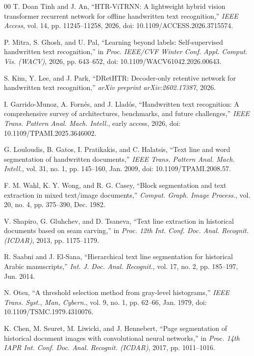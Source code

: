 \documentclass{IEEEtran}
\begin{document}
\begin{thebibliography}{00}
 T. Doan Tinh and J. An, ``HTR-ViTRNN: A lightweight hybrid vision transformer recurrent network for offline handwritten text recognition,'' \emph{IEEE Access}, vol. 14, pp. 11245--11258, 2026, doi: 10.1109/ACCESS.2026.3715574.

 P. Mitra, S. Ghosh, and U. Pal, ``Learning beyond labels: Self-supervised handwritten text recognition,'' in \emph{Proc. IEEE/CVF Winter Conf. Appl. Comput. Vis. (WACV)}, 2026, pp. 643--652, doi: 10.1109/WACV61042.2026.00643.

 S. Kim, Y. Lee, and J. Park, ``DRetHTR: Decoder-only retentive network for handwritten text recognition,'' \emph{arXiv preprint arXiv:2602.17387}, 2026.

 I. Garrido-Munoz, A. Forn{\'e}s, and J. Llad{\'o}s, ``Handwritten text recognition: A comprehensive survey of architectures, benchmarks, and future challenges,'' \emph{IEEE Trans. Pattern Anal. Mach. Intell.}, early access, 2026, doi: 10.1109/TPAMI.2025.3646002.

 G. Louloudis, B. Gatos, I. Pratikakis, and C. Halatsis, ``Text line and word segmentation of handwritten documents,'' \emph{IEEE Trans. Pattern Anal. Mach. Intell.}, vol. 31, no. 1, pp. 145--160, Jan. 2009, doi: 10.1109/TPAMI.2008.57.

 F. M. Wahl, K. Y. Wong, and R. G. Casey, ``Block segmentation and text extraction in mixed text/image documents,'' \emph{Comput. Graph. Image Process.}, vol. 20, no. 4, pp. 375--390, Dec. 1982.

 V. Shapiro, G. Gluhchev, and D. Tsaneva, ``Text line extraction in historical documents based on seam carving,'' in \emph{Proc. 12th Int. Conf. Doc. Anal. Recognit. (ICDAR)}, 2013, pp. 1175--1179.

 R. Saabni and J. El-Sana, ``Hierarchical text line segmentation for historical Arabic manuscripts,'' \emph{Int. J. Doc. Anal. Recognit.}, vol. 17, no. 2, pp. 185--197, Jun. 2014.

 N. Otsu, ``A threshold selection method from gray-level histograms,'' \emph{IEEE Trans. Syst., Man, Cybern.}, vol. 9, no. 1, pp. 62--66, Jan. 1979, doi: 10.1109/TSMC.1979.4310076.

 K. Chen, M. Seuret, M. Liwicki, and J. Hennebert, ``Page segmentation of historical document images with convolutional neural networks,'' in \emph{Proc. 14th IAPR Int. Conf. Doc. Anal. Recognit. (ICDAR)}, 2017, pp. 1011--1016.


\end{thebibliography}
\end{document}
